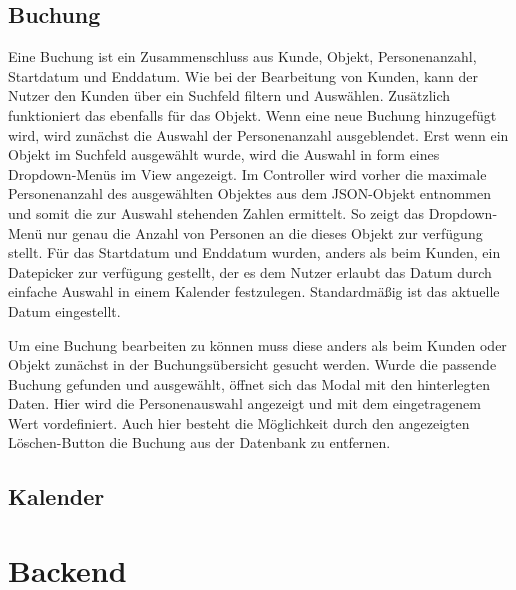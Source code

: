   
\subsection{Buchung}
Eine Buchung ist ein Zusammenschluss aus Kunde, Objekt, Personenanzahl, Startdatum und Enddatum. Wie bei der Bearbeitung von Kunden, kann der Nutzer den Kunden über ein Suchfeld filtern und Auswählen. Zusätzlich funktioniert das ebenfalls für das Objekt. 
Wenn eine neue Buchung hinzugefügt wird, wird zunächst die Auswahl der Personenanzahl ausgeblendet. Erst wenn ein Objekt im Suchfeld ausgewählt wurde, wird die Auswahl in form eines Dropdown-Menüs im View angezeigt. Im Controller wird vorher die maximale Personenanzahl des ausgewählten Objektes aus dem JSON-Objekt entnommen und somit die zur Auswahl stehenden Zahlen ermittelt. So zeigt das Dropdown-Menü nur genau die Anzahl von Personen an die dieses Objekt zur verfügung stellt. Für das Startdatum und Enddatum wurden, anders als beim Kunden, ein Datepicker zur verfügung gestellt, der es dem Nutzer erlaubt das Datum durch einfache Auswahl in einem Kalender festzulegen. Standardmäßig ist das aktuelle Datum eingestellt.

Um eine Buchung bearbeiten zu können muss diese anders als beim Kunden oder Objekt zunächst in der Buchungsübersicht gesucht werden. Wurde die passende Buchung gefunden und ausgewählt, öffnet sich das Modal mit den hinterlegten Daten. Hier wird die Personenauswahl angezeigt und mit dem eingetragenem Wert vordefiniert. Auch hier besteht die Möglichkeit durch den angezeigten Löschen-Button die Buchung aus der Datenbank zu entfernen.  

\subsection{Kalender}

 
\section{Backend}
